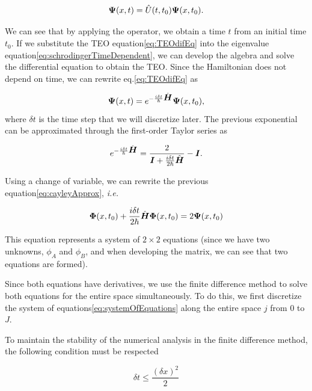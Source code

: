 \begin{equation}
    \label{eq:TEOdifEq}
    \mbox{\boldmath $\Psi$}(x,t)=\hat{U}(t,t_0)\mbox{\boldmath $\Psi$}(x,t_0).
\end{equation}

\noindent We can see that by applying the operator, we obtain a time $t$ from an initial time $t_0$.
If we substitute the TEO equation\eqref{eq:TEOdifEq} into the eigenvalue equation\eqref{eq:schrodingerTimeDependent}, we can develop the algebra and solve the differential equation to obtain the TEO\@.
Since the Hamiltonian does not depend on time, we can rewrite eq.\eqref{eq:TEOdifEq} as

\begin{equation}
    \label{eq:TEOApplied}
    \mbox{\boldmath $\Psi$}(x,t)= e^{-\frac{i\delta t}{\hbar}\hat{\mbox{\boldmath $H$}}} \mbox{\boldmath $\Psi$}(x,t_0),
\end{equation}
\noindent where $\delta t$ is the time step that we will discretize later. The previous exponential can be approximated through the first-order Taylor series as

\begin{equation}
    \label{eq:cayleyApprox}
    e^{-\frac{i\delta t}{\hbar}\hat{\mbox{\boldmath $H$}}} = \frac{2}{\mbox{\boldmath $I$} + \frac{i\delta t}{2\hbar}\hat{\mbox{\boldmath $H$}}}-\mbox{\boldmath $I$}.
\end{equation}

Using a change of variable, we can rewrite the previous equation\eqref{eq:cayleyApprox}, \textit{i.e.}

\begin{equation}
    \label{eq:systemOfEquations}
    \mbox{\boldmath $\Phi$}(x,t_0) + \frac{i\delta t}{2\hbar}\hat{\mbox{\boldmath $H$}}\mbox{\boldmath $\Phi$}(x,t_0)=2\mbox{\boldmath $\Psi$}(x,t_0)
\end{equation}

\noindent This equation represents a system of $2\times2$ equations (since we have two unknowns, $\phi_A$ and $\phi_B$, and when developing the matrix, we can see that two equations are formed).

Since both equations have derivatives, we use the finite difference method to solve both equations for the entire space simultaneously.
To do this, we first discretize the system of equations\eqref{eq:systemOfEquations} along the entire space $j$ from $0$ to $J$.

To maintain the stability of the numerical analysis in the finite difference method, the following condition must be respected \cite{Carrillo2015}

\begin{equation}
    \label{eq:stabilityCondition}
    \delta t \leq \frac{\left( \delta x \right)^2}{2}
\end{equation}

